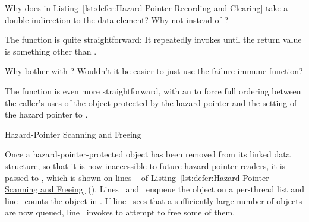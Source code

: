 \begin{lineref}
\QuickQuiz{}
	Why does  in
	Listing~\ref{lst:defer:Hazard-Pointer Recording and Clearing}
	take a double indirection to the data element?
	Why not  instead of ?
 \QuickQuizEnd

The  function is quite straightforward: It repeatedly
invokes  until the return value is something other
than .

\QuickQuiz{}
	Why bother with ?
	Wouldn't it be easier to just use the failure-immune
	 function?
 \QuickQuizEnd

The  function is even more straightforward, with
an  to force full ordering between the caller's uses
of the object protected by the hazard pointer and the setting of
the hazard pointer to .
\end{lineref}

\begin{listing}[tbp]

\caption{Hazard-Pointer Scanning and Freeing}
\label{lst:defer:Hazard-Pointer Scanning and Freeing}
\end{listing}

\begin{lineref}
Once a hazard-pointer-protected object has been removed from its
linked data structure, so that it is now inaccessible to future
hazard-pointer readers, it is passed to ,
which is shown on lines~- of
Listing~\ref{lst:defer:Hazard-Pointer Scanning and Freeing}
().
Lines~ and~
enqueue the object on a per-thread list 
and line~ counts the object in .
If line~ sees that a sufficiently large number of objects are now
queued, line~ invokes  to attempt to
free some of them.
\end{lineref}

